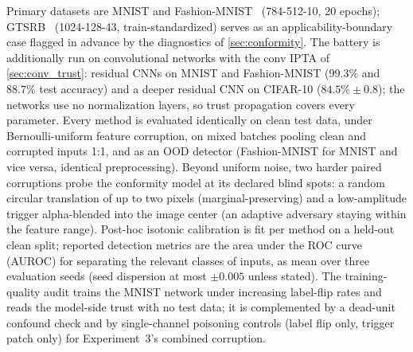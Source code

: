 Primary datasets are MNIST and Fashion-MNIST~\cite{xiao2017fashionmnist} (784-512-10, 20 epochs); GTSRB~\cite{GTSRB} (1024-128-43, train-standardized) serves as an applicability-boundary case flagged in advance by the diagnostics of \cref{sec:conformity}. The battery is additionally run on convolutional networks with the conv \ac{IPTA} of \cref{sec:conv_trust}: residual \acp{CNN} on MNIST and Fashion-MNIST ($99.3\%$ and $88.7\%$ test accuracy) and a deeper residual \ac{CNN} on CIFAR-10 ($84.5\% \pm 0.8$); the networks use no normalization layers, so trust propagation covers every parameter. Every method is evaluated identically on clean test data, under Bernoulli-uniform feature corruption, on mixed batches pooling clean and corrupted inputs 1:1, and as an \ac{OOD} detector (Fashion-MNIST for MNIST and vice versa, identical preprocessing). Beyond uniform noise, two harder paired corruptions probe the conformity model at its declared blind spots: a random circular translation of up to two pixels (marginal-preserving) and a low-amplitude trigger alpha-blended into the image center (an adaptive adversary staying within the feature range). Post-hoc isotonic calibration is fit per method on a held-out clean split; reported detection metrics are the area under the ROC curve (AUROC) for separating the relevant classes of inputs, as mean over three evaluation seeds (seed dispersion at most $\pm 0.005$ unless stated). The training-quality audit trains the MNIST network under increasing label-flip rates and reads the model-side trust with no test data; it is complemented by a dead-unit confound check and by single-channel poisoning controls (label flip only, trigger patch only) for Experiment~3's combined corruption.

